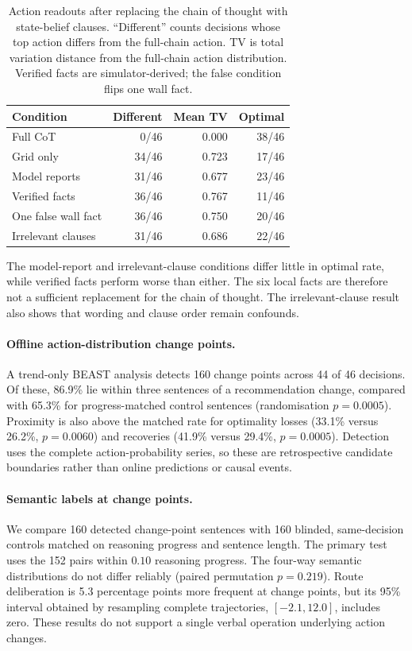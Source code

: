 \documentclass{article}
\begin{document}
\begin{table}[htbp]
\centering
\small
\begin{tabular}{lrrr}
\toprule
Condition & Different & Mean TV & Optimal \\
\midrule
Full CoT & 0/46 & 0.000 & 38/46 \\
Grid only & 34/46 & 0.723 & 17/46 \\
Model reports & 31/46 & 0.677 & 23/46 \\
Verified facts & 36/46 & 0.767 & 11/46 \\
One false wall fact & 36/46 & 0.750 & 20/46 \\
Irrelevant clauses & 31/46 & 0.686 & 22/46 \\
\bottomrule
\end{tabular}
\caption{Action readouts after replacing the chain of thought with state-belief
clauses. ``Different'' counts decisions whose top action differs from the
full-chain action. TV is total variation distance from the full-chain action
distribution. Verified facts are simulator-derived; the false condition flips
one wall fact.}
\label{tab:belief-clause-sufficiency}
\end{table}

The model-report and irrelevant-clause conditions differ little in optimal
rate, while verified facts perform worse than either. The six local facts are
therefore not a sufficient replacement for the chain of thought. The
irrelevant-clause result also shows that wording and clause order remain
confounds.

\paragraph{Offline action-distribution change points.}
A trend-only BEAST analysis detects 160 change points across 44 of 46 decisions.
Of these, 86.9\% lie within three sentences of a recommendation change, compared
with 65.3\% for progress-matched control sentences (randomisation
$p=0.0005$). Proximity is also above the matched rate for optimality losses
(33.1\% versus 26.2\%, $p=0.0060$) and recoveries (41.9\% versus 29.4\%,
$p=0.0005$). Detection uses the complete action-probability series, so these
are retrospective candidate boundaries rather than online predictions or
causal events.

\paragraph{Semantic labels at change points.}
We compare 160 detected change-point sentences with 160 blinded, same-decision
controls matched on reasoning progress and sentence length. The primary test
uses the 152 pairs within $0.10$ reasoning progress. The four-way semantic
distributions do not differ reliably (paired permutation $p=0.219$). Route
deliberation is 5.3 percentage points more frequent at change points, but its
95\% interval obtained by resampling complete trajectories,
$[-2.1,12.0]$, includes zero. These
results do not support a single verbal operation underlying action changes.
\end{document}
